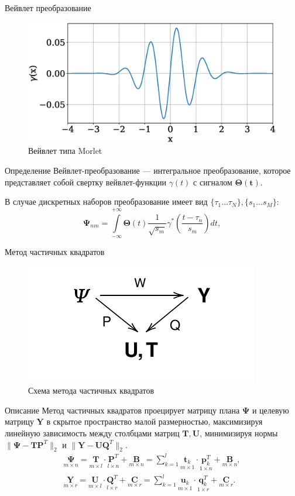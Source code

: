 \documentclass[9pt,pdf,hyperref={unicode}]{beamer}
\begin{document}
\begin{frame}{Вейвлет преобразование}
\begin{figure}
	\includegraphics[width=0.6\linewidth]{figs/morl.eps}
	\caption{Вейвлет типа Morlet}
\end{figure}
\begin{block}{Определение}
	Вейвлет-преобразование --- интегральное преобразование, которое представляет собой свертку вейвлет-функции $\gamma(t)$ с сигналом $\mathbf{\Theta(t)}$.
	
В случае дискретных наборов преобразование имеет вид $\{\tau_1 \ldots \tau_N\}, \{s_1 \ldots s_M \}$:
\[
\mathbf{\Psi}_{nm} = \int \limits _{{-\infty }}^{{+\infty }}\mathbf{\Theta}(t){\frac  {1}{{\sqrt  {s_m}}}}\gamma ^{{*}}\left({\frac  {t-\tau_n }{s_m}}\right)dt,	
\]
\end{block}
\end{frame}
\begin{frame}{Метод частичных квадратов}
\begin{figure}
	\includegraphics[width=0.3\linewidth]{figs/pls.pdf}
	\caption{Схема метода частичных квадратов}
\end{figure}
\begin{block}{Описание}
	Метод частичных квадратов проецирует матрицу плана $\mathbf{\Psi}$ и целевую матрицу $\mathbf{Y}$ в скрытое пространство малой размерностью, максимизируя линейную зависимость между столбцами матриц $\mathbf{T}, \mathbf{U}$, минимизируя нормы $\|\mathbf{\Psi} - \mathbf{T}\mathbf{P}^T\|_2$ и $\|\mathbf{Y} - \mathbf{U}\mathbf{Q}^T\|_2$.
	\begin{equation*}
	\begin{split}
	\underset{m\times n
	}{\mathbf{\Psi}}= \underset{m\times l}{\mathbf{T}} \cdot \underset{l\times n
	}{\mathbf{P}^T}
	+ \underset{m\times n}{\mathbf{B}}
	=
	\sum_{k=1}^{l}
	\underset{m\times 1}{\mathbf{t}_k}
	\cdot\underset{1\times n}{\mathbf{p}^T_k}
	+ \underset{m\times n}{\mathbf{B}}
	, 
	\\ 
	\underset{m\times r}{\mathbf{Y}}
	= \underset{m\times l}{\mathbf{U}} \cdot \underset{l\times r
	}{\mathbf{Q}^T}
	+ \underset{m\times r
	}{\mathbf{C}}= \sum_{k=1}^l
	\underset{m\times 1}{\mathbf{u}_k} \cdot \underset{1\times r}{\mathbf{q}^T_k}
	+ \underset{m\times r}{\mathbf{C}}.
	\end{split}
	\end{equation*}
\end{block}
\end{frame}
\end{document}
